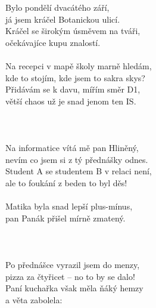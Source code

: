 
Bylo pondělí dvacátého září,\\
já jsem kráčel Botanickou ulicí.\\
Kráčel se širokým úsměvem na tváři,\\
očekávajíce kupu znalostí.\\
\\
Na recepci v mapě školy marně hledám,\\
kde to stojím, kde jsem to sakra skys?\\
Přidávám se k davu, mířím směr D1,\\
větší chaos už je snad jenom ten IS.\\
\\
\\
\\
Na informatice vítá mě pan Hliněný,\\
nevím co jsem si z tý přednášky odnes.\\
Student A se studentem B v relaci není,\\
ale to foukání z beden to byl děs!\\
\\
Matika byla snad lepší plus-mínus,\\
pan Panák přišel mírně zmatený.\\
\\
\chorus\\
\\
Po přednášce vyrazil jsem do menzy,\\
pizza za čtyřicet -- no to by se dalo!\\
Paní kuchařka však měla ňáký hemzy\\
a věta zabolela: \\

